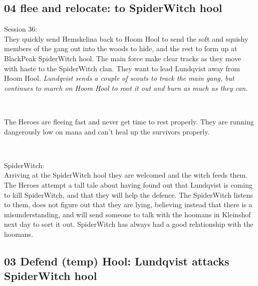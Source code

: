 \subsection*{04 flee and relocate: to SpiderWitch hool}

\forceindent Session 36:\\                                              %
They quickly send Hemskelina back to Hoom Hool to send the soft and squishy members of the gang out into the woods to hide, and the rest to form up at BlackPeak SpiderWitch hool. The main force make clear tracks as they move with haste to the SpiderWitch clan. They want to lead Lundqvist away from Hoom Hool.
\emph{Lundqvist sends a couple of scouts to track the main gang, but continues to march on Hoom Hool to root it out and burn as much as they can.}

\

The Heroes are fleeing fast and never get time to rest properly. They are running dangerously low on mana and can't heal up the survivors properly.

\

SpiderWitch:\\
Arriving at the SpiderWitch hool they are welcomed and the witch feeds them. The Heroes attempt a tall tale about having found out that Lundqvist is coming to kill SpiderWitch, and that they will help the defence. The SpiderWitch listens to them, does not figure out that they are lying, believing instead that there is a misunderstanding, and will send someone to talk with the hoomans in Kleinshof next day to sort it out. SpiderWitch has always had a good relationship with the hoomans.




\subsection*{03 Defend (temp) Hool: Lundqvist attacks SpiderWitch hool}

